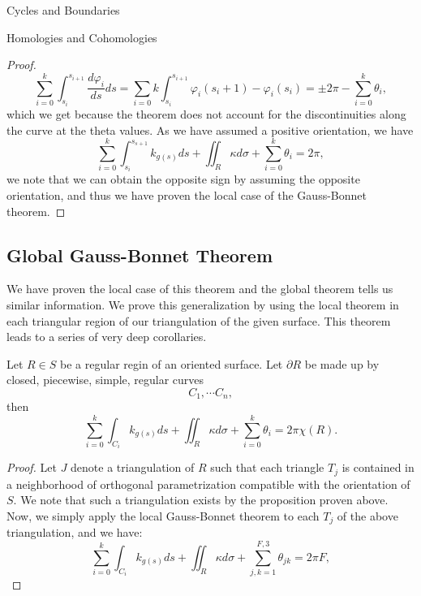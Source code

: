 \begin{subsubsection}{Cycles and Boundaries}
\begin{subsubsection}{Homologies and Cohomologies}
\begin{proof}
\begin{equation}
  \sum_{i=0}^k\int_{s_i}^{s_{i+1}}\frac{d\varphi_i}{ds}ds
  = \sum_{i=0}{k}\int_{s_i}^{s_{i+1}}\varphi_i(s_i+1) - \varphi_i(s_i) = \pm
  2\pi - \sum_{i=0}^k\theta_i,
\end{equation}
which we get because the theorem does not account for the  discontinuities
along the curve at the theta values. As we have assumed a positive orientation,
we have
\begin{equation}
  \sum_{i=0}^k\int_{s_i}^{s_{s+1}}k_{g(s)}ds + \iint_R \kappa d\sigma
  + \sum_{i=0}^k \theta_i = 2\pi,
\end{equation}
we note that we can obtain the opposite sign by assuming the opposite
orientation, and thus we have proven the local case of the Gauss-Bonnet
theorem.
\end{proof}
\subsection{Global Gauss-Bonnet Theorem}
\begin{remark} We have proven the local case of this theorem and the global
  theorem tells us similar information. We prove this generalization by using
  the local theorem in each triangular region of our triangulation of the given
  surface. This theorem leads to a series of very deep corollaries.
\end{remark}
\begin{theorem} Let $R\in S$ be a regular regin of an oriented surface. Let
  $\partial R$ be made up by closed, piecewise, simple, regular curves
  \begin{equation}
    C_1,\cdots C_n,
  \end{equation}
  then
  \begin{equation}
    \sum_{i=0}^k\int_{C_i} k_{g(s)}ds +\iint_R \kappa d\sigma
    + \sum_{i=0}^k\theta_i = 2\pi \chi(R).
  \end{equation}
\end{theorem}
\begin{proof}
  Let $J$ denote a triangulation of $R$ such that each triangle $T_j$ is
  contained in a neighborhood of orthogonal parametrization compatible with
  the orientation of $S$. We note that such a triangulation exists by the
  proposition proven above. Now, we simply apply the local Gauss-Bonnet theorem
  to each $T_j$ of the above triangulation, and we have:
  \begin{equation}
    \sum_{i=0}^k\int_{C_i} k_{g(s)}ds + \iint_R \kappa d\sigma
    + \sum_{j,k=1}^{F,3}\theta_{jk} =2\pi F,

\end{equation}
\end{proof}
\end{subsubsection}
\end{subsubsection}
